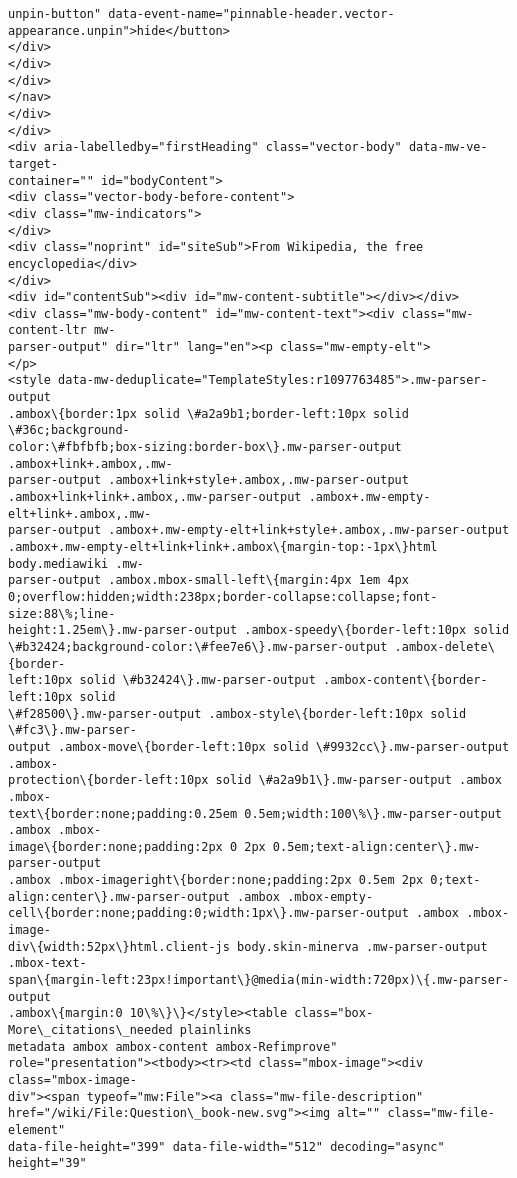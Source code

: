 \documentclass[11pt]{article}
\begin{document}
\begin{Verbatim}[commandchars=\\\{\}]
unpin-button" data-event-name="pinnable-header.vector-
appearance.unpin">hide</button>
</div>
</div>
</div>
</nav>
</div>
</div>
<div aria-labelledby="firstHeading" class="vector-body" data-mw-ve-target-
container="" id="bodyContent">
<div class="vector-body-before-content">
<div class="mw-indicators">
</div>
<div class="noprint" id="siteSub">From Wikipedia, the free encyclopedia</div>
</div>
<div id="contentSub"><div id="mw-content-subtitle"></div></div>
<div class="mw-body-content" id="mw-content-text"><div class="mw-content-ltr mw-
parser-output" dir="ltr" lang="en"><p class="mw-empty-elt">
</p>
<style data-mw-deduplicate="TemplateStyles:r1097763485">.mw-parser-output
.ambox\{border:1px solid \#a2a9b1;border-left:10px solid \#36c;background-
color:\#fbfbfb;box-sizing:border-box\}.mw-parser-output .ambox+link+.ambox,.mw-
parser-output .ambox+link+style+.ambox,.mw-parser-output
.ambox+link+link+.ambox,.mw-parser-output .ambox+.mw-empty-elt+link+.ambox,.mw-
parser-output .ambox+.mw-empty-elt+link+style+.ambox,.mw-parser-output
.ambox+.mw-empty-elt+link+link+.ambox\{margin-top:-1px\}html body.mediawiki .mw-
parser-output .ambox.mbox-small-left\{margin:4px 1em 4px
0;overflow:hidden;width:238px;border-collapse:collapse;font-size:88\%;line-
height:1.25em\}.mw-parser-output .ambox-speedy\{border-left:10px solid
\#b32424;background-color:\#fee7e6\}.mw-parser-output .ambox-delete\{border-
left:10px solid \#b32424\}.mw-parser-output .ambox-content\{border-left:10px solid
\#f28500\}.mw-parser-output .ambox-style\{border-left:10px solid \#fc3\}.mw-parser-
output .ambox-move\{border-left:10px solid \#9932cc\}.mw-parser-output .ambox-
protection\{border-left:10px solid \#a2a9b1\}.mw-parser-output .ambox .mbox-
text\{border:none;padding:0.25em 0.5em;width:100\%\}.mw-parser-output .ambox .mbox-
image\{border:none;padding:2px 0 2px 0.5em;text-align:center\}.mw-parser-output
.ambox .mbox-imageright\{border:none;padding:2px 0.5em 2px 0;text-
align:center\}.mw-parser-output .ambox .mbox-empty-
cell\{border:none;padding:0;width:1px\}.mw-parser-output .ambox .mbox-image-
div\{width:52px\}html.client-js body.skin-minerva .mw-parser-output .mbox-text-
span\{margin-left:23px!important\}@media(min-width:720px)\{.mw-parser-output
.ambox\{margin:0 10\%\}\}</style><table class="box-More\_citations\_needed plainlinks
metadata ambox ambox-content ambox-Refimprove"
role="presentation"><tbody><tr><td class="mbox-image"><div class="mbox-image-
div"><span typeof="mw:File"><a class="mw-file-description"
href="/wiki/File:Question\_book-new.svg"><img alt="" class="mw-file-element"
data-file-height="399" data-file-width="512" decoding="async" height="39"

\end{Verbatim}
\end{document}

